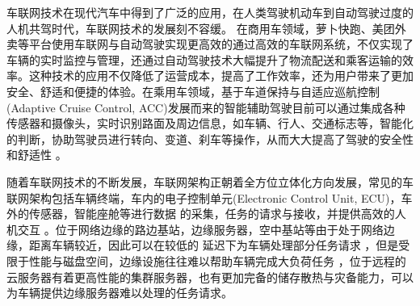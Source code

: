 车联网技术在现代汽车中得到了广泛的应用，在人类驾驶机动车到自动驾驶过度的人机共驾时代，车联网技术的发展刻不容缓。
在商用车领域，萝卜快跑、美团外卖等平台使用车联网与自动驾驶实现更高效的通过高效的车联网系统，不仅实现了车辆的实时监控与管理，还通过自动驾驶技术大幅提升了物流配送和乘客运输的效率。这种技术的应用不仅降低了运营成本，提高了工作效率，还为用户带来了更加安全、舒适和便捷的体验。在乘用车领域，基于车道保持与自适应巡航控制(Adaptive Cruise Control, ACC)发展而来的智能辅助驾驶目前可以通过集成各种传感器和摄像头，实时识别路面及周边信息，如车辆、行人、交通标志等，智能化的判断，协助驾驶员进行转向、变道、刹车等操作，从而大大提高了驾驶的安全性和舒适性 \supercite{SurveyofDeep8951131}。%

随着车联网技术的不断发展，车联网架构正朝着全方位立体化方向发展，常见的车联网架构包括车辆终端，车内的电子控制单元(Electronic Control Unit, ECU)，车外的传感器，智能座舱等进行数据
的采集，任务的请求与接收，并提供高效的人机交互 \supercite{Edge10213996}。位于网络边缘的路边基站，边缘服务器，空中基站等由于处于网络边缘，距离车辆较近，因此可以在较低的
延迟下为车辆处理部分任务请求 \supercite{EdgeComputing2019,Autonomous9756370}，但是受限于性能与磁盘空间，边缘设施往往难以帮助车辆完成大负荷任务
，位于远程的云服务器有着更高性能的集群服务器，也有更加完备的储存散热与灾备能力，可以为车辆提供边缘服务器难以处理的任务请求。

